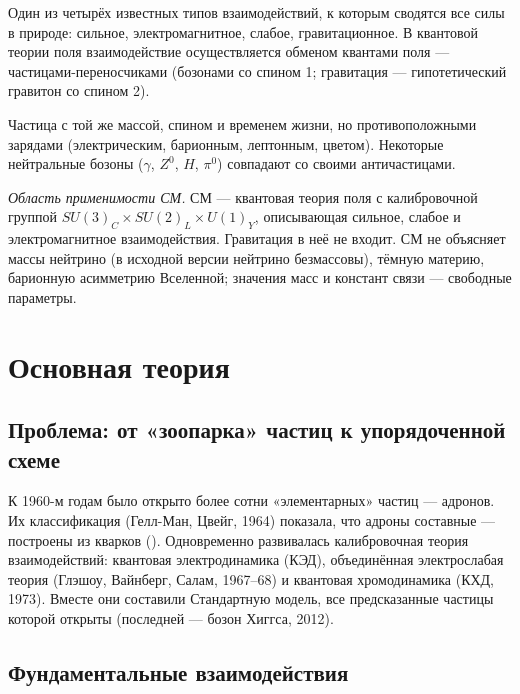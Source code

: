 \begin{definition}
Один из четырёх известных типов взаимодействий, к которым сводятся все силы в природе: сильное,
электромагнитное, слабое, гравитационное. В квантовой теории поля взаимодействие осуществляется
обменом квантами поля — частицами-переносчиками (бозонами со спином 1; гравитация — гипотетический
гравитон со спином 2).
\end{definition}

\begin{definition}[античастица]
Частица с той же массой, спином и временем жизни, но противоположными зарядами (электрическим,
барионным, лептонным, цветом). Некоторые нейтральные бозоны ($\gamma$, $Z^0$, $H$, $\pi^0$) совпадают со своими
античастицами.
\end{definition}

\emph{Область применимости СМ.} СМ — квантовая теория поля с калибровочной группой
$SU(3)_C\times SU(2)_L\times U(1)_Y$, описывающая сильное, слабое и электромагнитное взаимодействия.
Гравитация в неё не входит. СМ не объясняет массы нейтрино (в исходной версии нейтрино безмассовы),
тёмную материю, барионную асимметрию Вселенной; значения масс и констант связи — свободные параметры.

\section{Основная теория}

\subsection{Проблема: от «зоопарка» частиц к упорядоченной схеме}

К 1960-м годам было открыто более сотни «элементарных» частиц — адронов. Их классификация
(Гелл-Ман, Цвейг, 1964) показала, что адроны составные — построены из кварков ().
Одновременно развивалась калибровочная теория взаимодействий: квантовая электродинамика (КЭД),
объединённая электрослабая теория (Глэшоу, Вайнберг, Салам, 1967--68) и квантовая хромодинамика
(КХД, 1973). Вместе они составили Стандартную модель, все предсказанные частицы которой открыты
(последней — бозон Хиггса, 2012).

\subsection{Фундаментальные взаимодействия}

